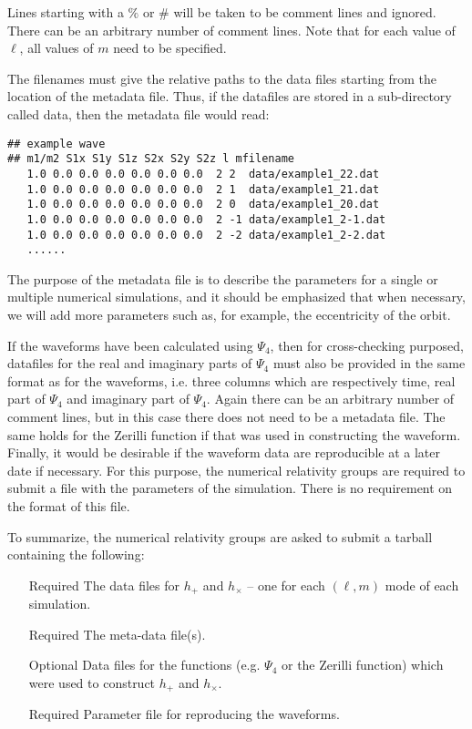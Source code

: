 \documentclass[10pt]{ligodcc}
\renewcommand{\texttt}[1]{{\ttfamily\color{blue}#1}}
\begin{document}
Lines starting with a $\%$ or $\#$ will be taken to be comment lines and
ignored.  There can be an arbitrary number of comment lines.  Note
that for each value of $\ell$, all values of $m$ need to be specified.

The filenames must give the relative paths to the data files starting
from the location of the metadata file.  Thus, if the datafiles are
stored in a sub-directory called \texttt{data}, then the metadata file
would read:
\begin{verbatim}
## example wave
## m1/m2 S1x S1y S1z S2x S2y S2z l mfilename     
   1.0 0.0 0.0 0.0 0.0 0.0 0.0  2 2  data/example1_22.dat
   1.0 0.0 0.0 0.0 0.0 0.0 0.0  2 1  data/example1_21.dat
   1.0 0.0 0.0 0.0 0.0 0.0 0.0  2 0  data/example1_20.dat
   1.0 0.0 0.0 0.0 0.0 0.0 0.0  2 -1 data/example1_2-1.dat
   1.0 0.0 0.0 0.0 0.0 0.0 0.0  2 -2 data/example1_2-2.dat
   ......
\end{verbatim}
The purpose of the metadata file is to describe the parameters for a
single or multiple numerical simulations, and it should be emphasized
that when necessary, we will add more parameters such as, for example,
the eccentricity of the orbit.

If the waveforms have been calculated using $\Psi_4$, then for
cross-checking purposed, datafiles for the real and imaginary parts of
$\Psi_4$ must also be provided in the same format as for the
waveforms, i.e. three columns which are respectively time, real part
of $\Psi_4$ and imaginary part of $\Psi_4$.  Again there can be an
arbitrary number of comment lines, but in this case there does not
need to be a metadata file.  The same holds for the Zerilli function
if that was used in constructing the waveform. Finally, it would be
desirable if the waveform data are reproducible at a later date if
necessary.  For this purpose, the numerical relativity groups are
required to submit a file with the parameters of the simulation.
There is no requirement on the format of this file.  

To summarize, the numerical relativity groups are asked to submit a
tarball containing the following:
\begin{itemize}
\item [Required] The data files for $h_+$ and $h_\times$ -- one for
  each $(\ell,m)$ mode of each simulation.
\item [Required] The meta-data file(s).
\item [Optional] Data files for the functions (e.g. $\Psi_4$ or the
  Zerilli function) which were used to construct $h_{+}$ and $h_{\times}$.
\item [Required] Parameter file for reproducing the waveforms.
\end{itemize}
\end{document}

